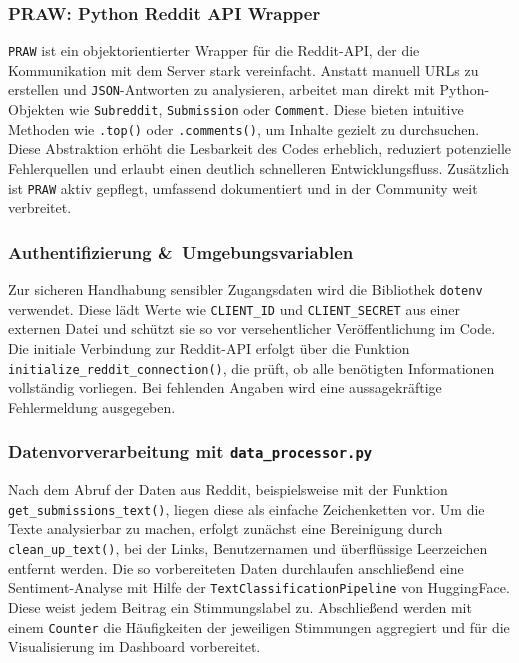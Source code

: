 \subsubsection{PRAW: Python Reddit API Wrapper}
\texttt{PRAW} ist ein objektorientierter Wrapper für die Reddit-API, der die Kommunikation mit dem Server stark vereinfacht.
Anstatt manuell URLs zu erstellen und \texttt{JSON}-Antworten zu analysieren, arbeitet man direkt mit Python-Objekten wie \texttt{Subreddit}, \texttt{Submission} oder \texttt{Comment}.
Diese bieten intuitive Methoden wie \texttt{.top()} oder \texttt{.comments()}, um Inhalte gezielt zu durchsuchen.
Diese Abstraktion erhöht die Lesbarkeit des Codes erheblich, reduziert potenzielle Fehlerquellen und erlaubt einen deutlich schnelleren Entwicklungsfluss.
Zusätzlich ist \texttt{PRAW} aktiv gepflegt, umfassend dokumentiert und in der Community weit verbreitet.

\subsubsection{Authentifizierung \&~Umgebungsvariablen}
Zur sicheren Handhabung sensibler Zugangsdaten wird die Bibliothek \texttt{dotenv} verwendet.
Diese lädt Werte wie \texttt{CLIENT\_ID} und \texttt{CLIENT\_SECRET} aus einer externen Datei und schützt sie so vor versehentlicher Veröffentlichung im Code.
Die initiale Verbindung zur Reddit-API erfolgt über die Funktion \texttt{initialize\_reddit\_connection()}, die prüft, ob alle benötigten Informationen vollständig vorliegen.
Bei fehlenden Angaben wird eine aussagekräftige Fehlermeldung ausgegeben.

\subsubsection{Datenvorverarbeitung mit \texttt{data\_processor.py}}
Nach dem Abruf der Daten aus Reddit, beispielsweise mit der Funktion \newline
\texttt{get\_submissions\_text()}, liegen diese als einfache Zeichenketten vor.
Um die Texte analysierbar zu machen, erfolgt zunächst eine Bereinigung durch \texttt{clean\_up\_text()}, bei der Links, Benutzernamen und überflüssige Leerzeichen entfernt werden.
Die so vorbereiteten Daten durchlaufen anschließend eine Sentiment-Analyse mit Hilfe der \newline
\texttt{TextClassificationPipeline} von HuggingFace.
Diese weist jedem Beitrag ein Stimmungslabel zu.
Abschließend werden mit einem \texttt{Counter} die Häufigkeiten der jeweiligen Stimmungen aggregiert und für die Visualisierung im Dashboard vorbereitet.

